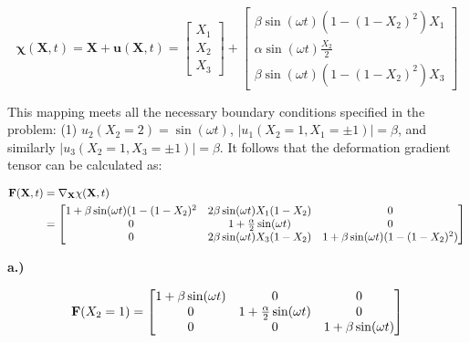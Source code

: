 \begin{equation*}
\mathbf{\chi}(\mathbf{X},t) = \mathbf{X} + \mathbf{u}(\mathbf{X},t) = \begin{bmatrix} X_1 \\ X_2 \\ X_3 \end{bmatrix} + 
\begin{bmatrix}
\beta \sin(\omega t) (1-(1-X_2)^2)X_1 \\
\alpha \sin(\omega t) \frac{X_2}{2} \\
\beta \sin(\omega t) (1-(1-X_2)^2)X_3
\end{bmatrix}
\end{equation*}

This mapping meets all the necessary boundary conditions specified in the problem: (1) $u_2(X_2 = 2) = \sin(\omega t)$, $|u_1(X_2 = 1, X_1 = \pm 1)| = \beta$, and similarly $|u_3(X_2 = 1, X_3 = \pm 1)| = \beta$. It follows that the deformation gradient tensor can be calculated as: 

\begin{align*}
\mathbf{F}(\mathbf{X},t) &= \nabla_{\mathbf{X}}\mathbf{\chi}(\mathbf{X},t) \\
&= \begin{bmatrix}
    1+\beta \sin(\omega t)(1-(1-X_2)^2 & 2\beta\sin(\omega t)X_1(1-X_2) & 0 \\
    0 & 1 + \frac{\alpha}{2} \sin(\omega t) & 0 \\
    0 & 2\beta\sin(\omega t)X_3(1-X_2) & 1+\beta\sin(\omega t)(1-(1-X_2)^2)
\end{bmatrix}
\end{align*}

\textbf{a.)}

\begin{equation*}
    \mathbf{F}(X_2 = 1) = \begin{bmatrix}
        1+\beta\sin(\omega t) & 0 & 0 \\ 
        0 & 1 + \frac{\alpha}{2}\sin(\omega t) & 0 \\
        0 & 0 & 1 + \beta \sin(\omega t)
    \end{bmatrix}
\end{equation*}

